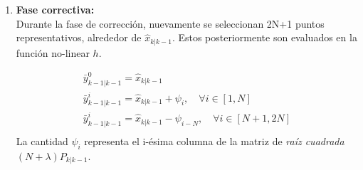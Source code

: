 \begin{enumerate}
\item \textbf{Fase correctiva:}\\
Durante la fase de correcci\'on, nuevamente se seleccionan 2N+1 puntos representativos, alrededor de $\hat{x}_{k|k-1}$. Estos posteriormente son evaluados en la funci\'on no-linear $h$.

\begin{equation}
\label{eq:eq24}
\begin{gathered}
\bar{y}_{k-1| k-1}^0 = \hat{x}_{k|k-1}\\
\bar{y}_{k-1| k-1}^i = \hat{x}_{k|k-1}+ \psi_i, \quad  \forall i \in [1, N]\\
\bar{y}_{k-1| k-1}^i = \hat{x}_{k|k-1}- \psi_{i-N}, \quad  \forall i \in [N+1, 2N]\\
\end{gathered}
\end{equation}
La cantidad $\psi_i$ representa el i-\'esima columna de la matriz de \textit{ra\'iz cuadrada} $(N+\lambda)P_{k|k-1}$.


\end{enumerate}
